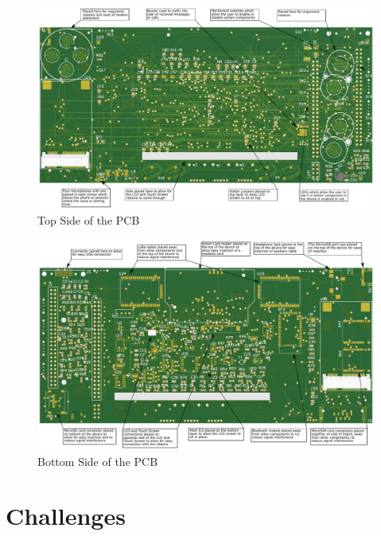 \begin{figure}
	\includegraphics[angle=90, width=\linewidth]{Figures/PCB_top.pdf}\centering
	\caption{Top Side of the PCB}
	\label{fig:PCB_top}
\end{figure}

\begin{figure}
	\includegraphics[angle=90, width=\linewidth]{Figures/PCB_bottom.pdf}\centering
	\caption{Bottom Side of the PCB}
	\label{fig:PCB_bottom}
\end{figure}


\section{Challenges}
\label{chap6sec7}

